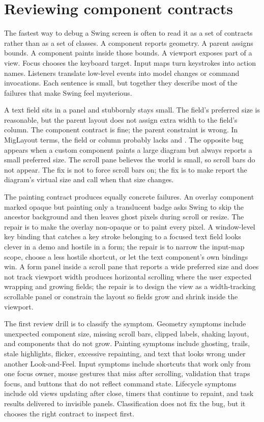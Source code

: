 \section{Reviewing component contracts}

The fastest way to debug a Swing screen is often to read it as a set of contracts rather than as a set of classes. A component reports geometry. A parent assigns bounds. A component paints inside those bounds. A viewport exposes part of a view. Focus chooses the keyboard target. Input maps turn keystrokes into action names. Listeners translate low-level events into model changes or command invocations. Each sentence is small, but together they describe most of the failures that make Swing feel mysterious.

A text field sits in a panel and stubbornly stays small. The field's preferred size is reasonable, but the parent layout does not assign extra width to the field's column. The component contract is fine; the parent constraint is wrong. In MigLayout terms, the field or column probably lacks  and . The opposite bug appears when a custom component paints a large diagram but always reports a small preferred size. The scroll pane believes the world is small, so scroll bars do not appear. The fix is not to force scroll bars on; the fix is to make  report the diagram's virtual size and call  when that size changes.

The painting contract produces equally concrete failures. An overlay component marked opaque but painting only a translucent badge asks Swing to skip the ancestor background and then leaves ghost pixels during scroll or resize. The repair is to make the overlay non-opaque or to paint every pixel. A window-level key binding that catches a key stroke belonging to a focused text field looks clever in a demo and hostile in a form; the repair is to narrow the input-map scope, choose a less hostile shortcut, or let the text component's own bindings win. A form panel inside a scroll pane that reports a wide preferred size and does not track viewport width produces horizontal scrolling where the user expected wrapping and growing fields; the repair is to design the view as a width-tracking scrollable panel or constrain the layout so fields grow and shrink inside the viewport.

The first review drill is to classify the symptom. Geometry symptoms include unexpected component size, missing scroll bars, clipped labels, shaking layout, and components that do not grow. Painting symptoms include ghosting, trails, stale highlights, flicker, excessive repainting, and text that looks wrong under another Look-and-Feel. Input symptoms include shortcuts that work only from one focus owner, mouse gestures that miss after scrolling, validation that traps focus, and buttons that do not reflect command state. Lifecycle symptoms include old views updating after close, timers that continue to repaint, and task results delivered to invisible panels. Classification does not fix the bug, but it chooses the right contract to inspect first.

